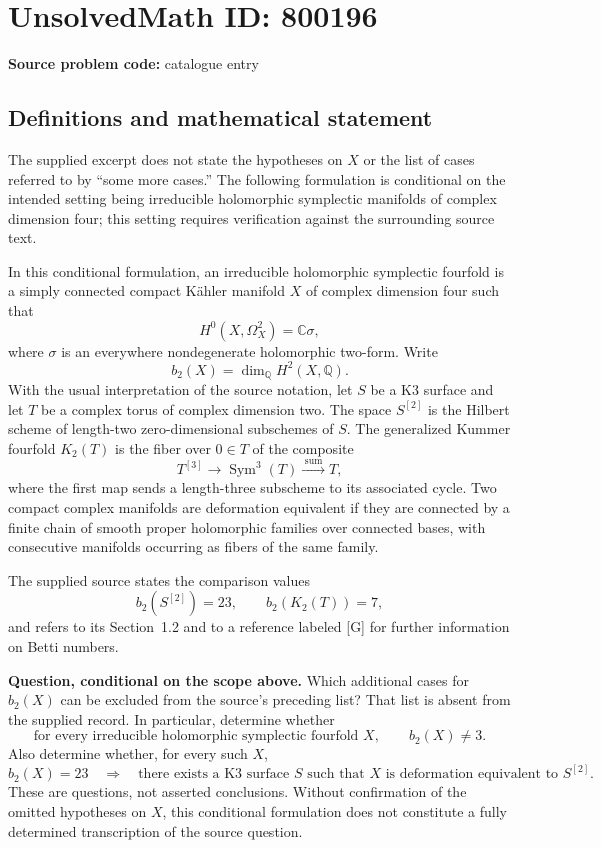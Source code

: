 \documentclass[11pt]{article}
\newcommand{\Q}{\mathbb{Q}}
\newcommand{\C}{\mathbb{C}}
\begin{document}
\section*{UnsolvedMath ID: 800196}
\textbf{Source problem code:} catalogue entry
\subsection{Definitions and mathematical statement}
The supplied excerpt does not state the hypotheses on \(X\) or the list of cases referred to by ``some more cases.'' The following formulation is conditional on the intended setting being irreducible holomorphic symplectic manifolds of complex dimension four; this setting requires verification against the surrounding source text.

In this conditional formulation, an irreducible holomorphic symplectic fourfold is a simply connected compact Kähler manifold \(X\) of complex dimension four such that
\[
H^0(X,\Omega_X^2)=\C\sigma,
\]
where \(\sigma\) is an everywhere nondegenerate holomorphic two-form. Write
\[
b_2(X)=\dim_{\Q}H^2(X,\Q).
\]
With the usual interpretation of the source notation, let \(S\) be a K3 surface and let \(T\) be a complex torus of complex dimension two. The space \(S^{[2]}\) is the Hilbert scheme of length-two zero-dimensional subschemes of \(S\). The generalized Kummer fourfold \(K_2(T)\) is the fiber over \(0\in T\) of the composite
\[
T^{[3]}\longrightarrow \operatorname{Sym}^3(T)\xrightarrow{\;\mathrm{sum}\;}T,
\]
where the first map sends a length-three subscheme to its associated cycle. Two compact complex manifolds are deformation equivalent if they are connected by a finite chain of smooth proper holomorphic families over connected bases, with consecutive manifolds occurring as fibers of the same family.

The supplied source states the comparison values
\[
b_2(S^{[2]})=23,\qquad b_2(K_2(T))=7,
\]
and refers to its Section~1.2 and to a reference labeled [G] for further information on Betti numbers.

\textbf{Question, conditional on the scope above.} Which additional cases for \(b_2(X)\) can be excluded from the source's preceding list? That list is absent from the supplied record. In particular, determine whether
\[
\text{for every irreducible holomorphic symplectic fourfold }X,\qquad b_2(X)\ne 3.
\]
Also determine whether, for every such \(X\),
\[
b_2(X)=23\quad\Longrightarrow\quad
\text{there exists a K3 surface }S\text{ such that }X\text{ is deformation equivalent to }S^{[2]}.
\]
These are questions, not asserted conclusions. Without confirmation of the omitted hypotheses on \(X\), this conditional formulation does not constitute a fully determined transcription of the source question.
\end{document}
